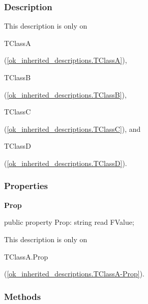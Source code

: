 \documentclass{report}
\newif\ifpdf
\begin{document}
\subsubsection*{\large{\textbf{Description}}\normalsize\hspace{1ex}\hfill}
This description is only on \begin{ttfamily}TClassA\end{ttfamily}(\ref{ok_inherited_descriptions.TClassA}), \begin{ttfamily}TClassB\end{ttfamily}(\ref{ok_inherited_descriptions.TClassB}), \begin{ttfamily}TClassC\end{ttfamily}(\ref{ok_inherited_descriptions.TClassC}), and \begin{ttfamily}TClassD\end{ttfamily}(\ref{ok_inherited_descriptions.TClassD}).\subsubsection*{\large{\textbf{Properties}}\normalsize\hspace{1ex}\hfill}
\begin{list}{}{
\setlength{\itemindent}{0cm}
\setlength{\listparindent}{0cm}
\setlength{\leftmargin}{\evensidemargin}
\addtolength{\leftmargin}{\tmplength}
\settowidth{\labelsep}{X}
\addtolength{\leftmargin}{\labelsep}
\setlength{\labelwidth}{\tmplength}
}
\label{ok_inherited_descriptions.TClassA-Prop}
\item[\textbf{Prop}\hfill]
\ifpdf
\begin{flushleft}
\fi
\begin{ttfamily}
public property Prop: string read FValue;\end{ttfamily}

\ifpdf
\end{flushleft}
\fi


\par This description is only on \begin{ttfamily}TClassA.Prop\end{ttfamily}(\ref{ok_inherited_descriptions.TClassA-Prop}).\end{list}
\subsubsection*{\large{\textbf{Methods}}\normalsize\hspace{1ex}\hfill}
\end{document}
